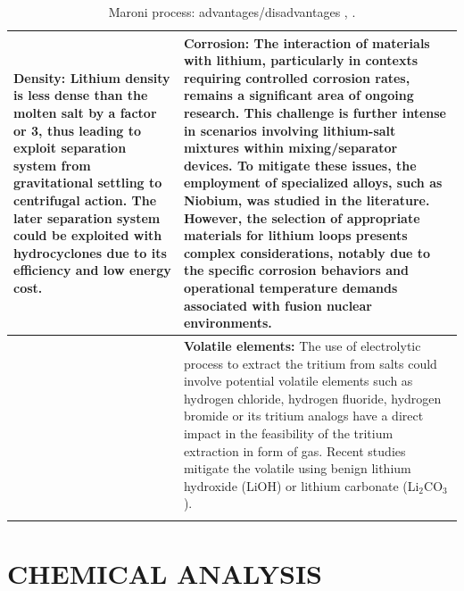 \begin{longtable}{p{7.5cm}p{7.5cm}}
	\rule[-0.3cm]{0pt}{0.8cm} \textbf{Density:} Lithium density is less dense than the molten salt by a factor or 3, thus leading to exploit separation system from gravitational settling to centrifugal action. The later separation system could be exploited with hydrocyclones due to its efficiency and low energy cost. & \textbf{Corrosion:} The interaction of materials with lithium, particularly in contexts requiring controlled corrosion rates, remains a significant area of ongoing research. This challenge is further intense in scenarios involving lithium-salt mixtures within mixing/separator devices. To mitigate these issues, the employment of specialized alloys, such as Niobium, was studied in the literature. However, the selection of appropriate materials for lithium loops presents complex considerations, notably due to the specific corrosion behaviors and operational temperature demands associated with fusion nuclear environments. \\ \hline
	
	\rule[-0.3cm]{0pt}{0.8cm}  & \textbf{Volatile elements:} The use of electrolytic process to extract the tritium from salts could involve potential volatile elements such as hydrogen chloride, hydrogen fluoride, hydrogen bromide or its tritium analogs have a direct impact in the feasibility of the tritium extraction in form of gas. Recent studies mitigate the volatile using benign lithium hydroxide (LiOH) or lithium carbonate (Li$_2$CO$_3$).  \\ \hline
	\captionsetup{font=bf, size=small}
	\caption{Maroni process: advantages/disadvantages \cite{Maroni1975}, \cite{Bandhauer2013}.}
	\label{ad_dis_maroni}
\end{longtable}

\newpage
\section{CHEMICAL ANALYSIS} \label{sec:chem}%

